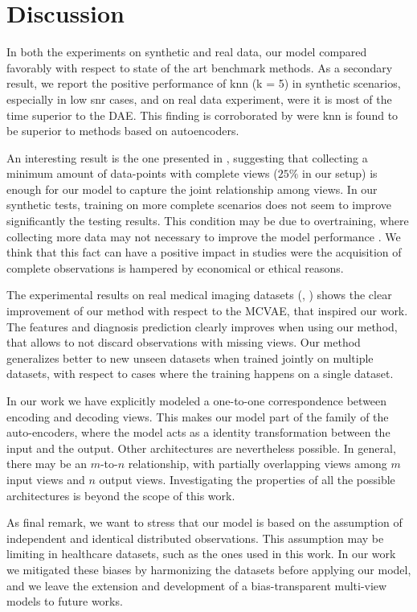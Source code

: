 \section{Discussion}

In both the experiments on synthetic and real data, our model compared favorably with respect to state of the art benchmark methods.
As a secondary result, we report the positive performance of knn (k = 5) in synthetic scenarios, especially in low snr cases, and on real data experiment, were it is most of the time superior to the DAE.
This finding is corroborated by \cite{Platias2020} were knn is found to be superior to methods based on autoencoders.

An interesting result is the one presented in , suggesting that collecting a minimum amount of data-points with complete views ($25\%$ in our setup) is enough for our model to capture the joint relationship among views.
In our synthetic tests, training on more complete scenarios does not seem to improve significantly the testing results.
This condition may be due to overtraining, where collecting more data may not necessary to improve the model performance \citep{Bilbao2017}.
We think that this fact can have a positive impact in studies were the acquisition of complete observations is hampered by economical or ethical reasons.

The experimental results on real medical imaging datasets (, ) shows the clear improvement of our method with respect to the MCVAE, that inspired our work.
The features and diagnosis prediction clearly improves when using our method, that allows to not discard observations with missing views.
Our method generalizes better to new unseen datasets when trained jointly on multiple datasets, with respect to cases where the training happens on a single dataset.

In our work we have explicitly modeled a one-to-one correspondence between encoding and decoding views.
This makes our model part of the family of the auto-encoders, where the model acts as a identity transformation between the input and the output.
Other architectures are nevertheless possible.
In general, there may be an $m$-to-$n$ relationship, with partially overlapping views among $m$ input views and $n$ output views.
Investigating the properties of all the possible architectures is beyond the scope of this work.

As final remark, we want to stress that our model is based on the assumption of independent and identical distributed observations.
This assumption may be limiting in healthcare datasets, such as the ones used in this work.
In our work we mitigated these biases by harmonizing the datasets before applying our model, and we leave the extension and development of a bias-transparent multi-view models to future works.

